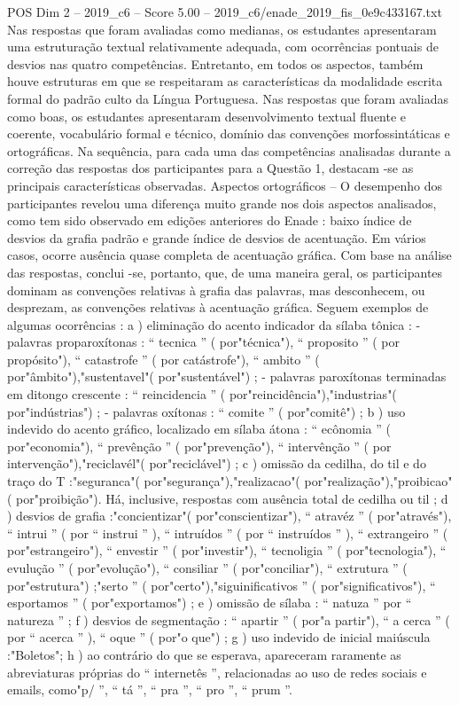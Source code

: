 \begin{textsample}{POS Dim 2 – 2019\_c6 – Score 5.00 – 2019\_c6/enade\_2019\_fis\_0e9c433167.txt}
Nas respostas que foram avaliadas como medianas, os estudantes apresentaram uma estruturação textual relativamente adequada, com ocorrências pontuais de desvios nas quatro competências.
Entretanto, em todos os aspectos, também houve estruturas em que se respeitaram as características da modalidade escrita formal do padrão culto da Língua Portuguesa.
Nas respostas que foram avaliadas como boas, os estudantes apresentaram desenvolvimento textual fluente e coerente, vocabulário formal e técnico, domínio das convenções morfossintáticas e ortográficas.
Na sequência, para cada uma das competências analisadas durante a correção das respostas dos participantes para a Questão 1, destacam -se as principais características observadas.
Aspectos ortográficos – O desempenho dos participantes revelou uma diferença muito grande nos dois aspectos analisados, como tem sido observado em edições anteriores do Enade : baixo índice de desvios da grafia padrão e grande índice de desvios de acentuação.
Em vários casos, ocorre ausência quase completa de acentuação gráfica.
Com base na análise das respostas, conclui -se, portanto, que, de uma maneira geral, os participantes dominam as convenções relativas à grafia das palavras, mas desconhecem, ou desprezam, as convenções relativas à acentuação gráfica.
Seguem exemplos de algumas ocorrências : a ) eliminação do acento indicador da sílaba tônica : - palavras proparoxítonas : “ tecnica ” ( por"técnica"), “ proposito ” ( por propósito"), “ catastrofe ” ( por catástrofe"), “ ambito ” ( por"âmbito"),"sustentavel"( por"sustentável") ; - palavras paroxítonas terminadas em ditongo crescente : “ reincidencia ” ( por"reincidência"),"industrias"( por"indústrias") ; - palavras oxítonas : “ comite ” ( por"comitê") ; b ) uso indevido do acento gráfico, localizado em sílaba átona : “ ecônomia ” ( por"economia"), “ prevênção ” ( por"prevenção"), “ intervênção ” ( por intervenção"),"reciclavél"( por"reciclável") ; c ) omissão da cedilha, do til e do traço do T :"seguranca"( por"segurança"),"realizacao"( por"realização"),"proibicao"( por"proibição").
Há, inclusive, respostas com ausência total de cedilha ou til ; d ) desvios de grafia :"concientizar"( por"conscientizar"), “ atravéz ” ( por"através"), “ intrui ” ( por “ instrui ” ), “ intruídos ” ( por “ instruídos ” ), “ extrangeiro ” ( por"estrangeiro"), “ envestir ” ( por"investir"), “ tecnoligia ” ( por"tecnologia"), “ evulução ” ( por"evolução"), “ consiliar ” ( por"conciliar"), “ extrutura ” ( por"estrutura") ;"serto ” ( por"certo"),"siguinificativos ” ( por"significativos"), “ esportamos ” ( por"exportamos") ; e ) omissão de sílaba : “ natuza ” por “ natureza ” ; f ) desvios de segmentação : “ apartir ” ( por"a partir"), “ a cerca ” ( por “ acerca ” ), “ oque ” ( por"o que") ; g ) uso indevido de inicial maiúscula :"Boletos"; h ) ao contrário do que se esperava, apareceram raramente as abreviaturas próprias do “ internetês ”, relacionadas ao uso de redes sociais e emails, como"p/ ”, “ tá ”, “ pra ”, “ pro ”, “ prum ”.

\end{textsample}

